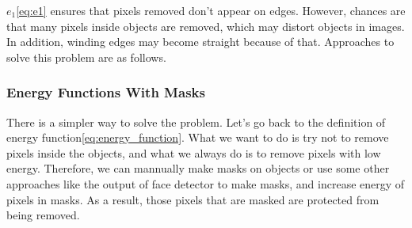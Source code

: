 \documentclass[final]{cvpr}
\begin{document}
$e_1$\ref{eq:e1} ensures that pixels removed don't appear on edges.
However, chances are that many pixels inside objects are removed, which may distort objects in images.
In addition, winding edges may become straight because of that.
Approaches to solve this problem are as follows.
\subsubsection{Energy Functions With Masks}
There is a simpler way to solve the problem.
Let's go back to the definition of energy function\ref{eq:energy_function}.
What we want to do is try not to remove pixels inside the objects, and what we always do is to remove pixels with low energy.
Therefore, we can mannually make masks on objects or use some other approaches like the output of face detector to make masks, and increase energy of pixels in masks.
As a result, those pixels that are masked are protected from being removed.
\end{document}
